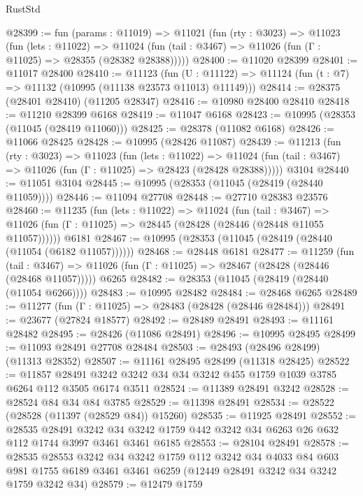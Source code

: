\begin{lexlean}{RustStd}
\begin{coremodule}
@28399 := fun (params : @11019) =>
  @11021
    (fun (rty : @3023) =>
    @11023
      (fun (lets : @11022) =>
      @11024 (fun (tail : @3467) => @11026 (fun (Γ : @11025) => @28355 (@28382 @28388)))))
@28400 := @11020 @28399
@28401 := @11017 @28400
@28410 := @11123
    (fun (U : @11122) => @11124 (fun (t : @7) => @11132 (@10995 (@11138 @23573 @11013) @11149)))
@28414 := @28375 (@28401 @28410) (@11205 @28347)
@28416 := @10980 @28400 @28410
@28418 := @11210 @28399 @6168
@28419 := @11047 @6168
@28423 := @10995 (@28353 (@11045 (@28419 @11060)))
@28425 := @28378 (@11082 @6168)
@28426 := @11066 @28425
@28428 := @10995 (@28426 @11087)
@28439 := @11213
    (fun (rty : @3023) =>
    @11023
      (fun (lets : @11022) =>
      @11024 (fun (tail : @3467) => @11026 (fun (Γ : @11025) => @28423 (@28428 @28388)))))
    @3104
@28440 := @11051 @3104
@28445 := @10995 (@28353 (@11045 (@28419 (@28440 @11059))))
@28446 := @11094 @27708
@28448 := @27710 @28383 @23576
@28460 := @11235
    (fun (lets : @11022) =>
    @11024
      (fun (tail : @3467) =>
      @11026 (fun (Γ : @11025) => @28445 (@28428 (@28446 (@28448 @11055 @11057))))))
    @6181
@28467 := @10995 (@28353 (@11045 (@28419 (@28440 (@11054 (@6182 @11057))))))
@28468 := @28448 @6181
@28477 := @11259
    (fun (tail : @3467) => @11026 (fun (Γ : @11025) => @28467 (@28428 (@28446 (@28468 @11057)))))
    @6265
@28482 := @28353 (@11045 (@28419 (@28440 (@11054 @6266))))
@28483 := @10995 @28482
@28484 := @28468 @6265
@28489 := @11277 (fun (Γ : @11025) => @28483 (@28428 (@28446 @28484)))
@28491 := @23677 (@27824 @18577)
@28492 := @28489 @28491
@28493 := @11161 @28482
@28495 := @28426 (@11086 @28491)
@28496 := @10995 @28495
@28499 := @11093 @28491 @27708 @28484
@28503 := @28493 (@28496 @28499) (@11313 @28352)
@28507 := @11161 @28495 @28499 (@11318 @28425)
@28522 := @11857
    @28491
    @3242
    @3242
    @34
    @34
    @3242
    @455
    @1759
    @1039
    @3785
    @6264
    @112
    @3505
    @6174
    @3511
@28524 := @11389 @28491 @3242
@28528 := @28524 @84 @34 @84 @3785
@28529 := @11398 @28491
@28534 := @28522 (@28528 (@11397 (@28529 @84)) @15260)
@28535 := @11925 @28491
@28552 := @28535
    @28491
    @3242
    @34
    @3242
    @1759
    @442
    @3242
    @34
    @6263
    @26
    @632
    @112
    @1744
    @3997
    @3461
    @3461
    @6185
@28553 := @28104 @28491
@28578 := @28535
    @28553
    @3242
    @34
    @3242
    @1759
    @112
    @3242
    @34
    @4033
    @84
    @603
    @981
    @1755
    @6189
    @3461
    @3461
    @6259
    (@12449 @28491 @3242 @34 @3242 @1759 @3242 @34)
@28579 := @12479 @1759

\end{coremodule}
\end{lexlean}

